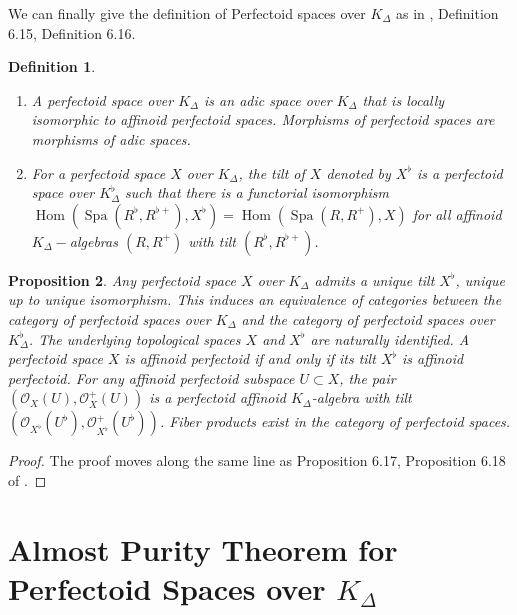 \documentclass[12pts,a4paper]{amsart}
\newtheorem{proposition}{Proposition}[section]
\newtheorem{definition}[proposition]{Definition}
\DeclareMathOperator{\Hom}{Hom}
\DeclareMathOperator{\spa}{Spa}
\begin{document}
We can finally give the definition of Perfectoid spaces over $K_\Delta$ as in \cite{Sch}, Definition 6.15, Definition 6.16.

\begin{definition}
   \begin{enumerate}
       \item[(i).] A \emph{perfectoid space} over $K_\Delta$ is an adic space over $K_\Delta$ that is locally isomorphic to affinoid perfectoid spaces. Morphisms of perfectoid spaces are morphisms of adic spaces. 
       \item[(ii).] For a perfectoid space $X$ over $K_\Delta$, the \emph{tilt} of $X$ denoted by $X^\flat$ is a perfectoid space over $K^\flat_\Delta$ such that there is a functorial isomorphism $\Hom(\spa(R^\flat,R^{\flat +}),X^\flat)=\Hom(\spa(R,R^+),X)$ for all affinoid $K_\Delta-$algebras $(R,R^+)$ with tilt $(R^\flat,R^{\flat +})$.
   \end{enumerate}
\end{definition}

\begin{proposition}
   Any perfectoid space $X$ over $K_\Delta$ admits a unique tilt $X^\flat$, unique up to unique isomorphism. This induces an equivalence of categories between the category of perfectoid spaces over $K_\Delta$ and the category of perfectoid spaces over $K^\flat_\Delta$. The underlying topological spaces $X$ and $X^\flat$ are naturally identified. A perfectoid space $X$ is affinoid perfectoid if and only if its tilt $X^\flat$ is affinoid perfectoid. For any affinoid perfectoid subspace $U\subset X$, the pair $(\mathcal{O}_X(U),\mathcal{O}^+_X(U))$ is a perfectoid affinoid $K_\Delta$-algebra with tilt $(\mathcal{O}_{X^\flat}(U^\flat),\mathcal{O}^+_{X^\flat}(U^\flat))$. Fiber products exist in the category of perfectoid spaces.
\end{proposition}

\begin{proof}
    The proof moves along the same line as Proposition 6.17, Proposition 6.18 of \cite{Sch}.
\end{proof}


\section{Almost Purity Theorem for Perfectoid Spaces over $K_\Delta$}
\end{document}
